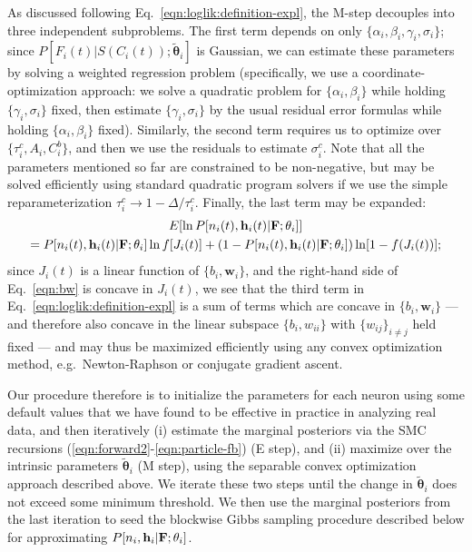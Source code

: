 \documentclass[aoas,preprint]{imsart}
\newcommand{\bth}{\mathbf{\theta}}
\newcommand{\w}{w}
\newcommand{\bw}{\mathbf{\w}}
\newcommand{\bF}{{\bf F}}
\newcommand{\bh}{\mathbf{h}}
\newcommand{\tbth}{\tilde{\bth}}
\begin{document}
As discussed following Eq.~\eqref{eqn:loglik:definition-expl}, the
M-step decouples into three independent subproblems. The first term
depends on only $\{\alpha_i, \beta_i, \gamma_i, \sigma_i\}$; since
$P[F_i(t)|S(C_i(t)); \tbth_i]$ is Gaussian, we can estimate these
parameters by solving a weighted regression problem (specifically, we
use a coordinate-optimization approach: we solve a quadratic problem
for $\{\alpha_i, \beta_i\}$ while holding $\{\gamma_i, \sigma_i\}$
fixed, then estimate $\{\gamma_i,\sigma_i\}$ by the usual residual
error formulas while holding $\{\alpha_i, \beta_i\}$
fixed). Similarly, the second term requires us to optimize over
$\{\tau_i^c, A_i, C_i^b\}$, and then we use the residuals to estimate
$\sigma_i^c$. Note that all the parameters mentioned so far are
constrained to be non-negative, but may be solved efficiently using
standard quadratic program solvers if we use the simple
reparameterization $\tau_i^c \to 1- \Delta / \tau_i^c$. Finally, the
last term may be expanded:
\begin{multline}
E [\ln P[n_i(t), \bh_i(t) | \bF; \bth_i]] \\ = P[n_i(t), \bh_i(t) |
\bF; \bth_i] \ln f [J_i(t)] + (1-P[n_i(t), \bh_i(t) | \bF; \bth_i])
\ln [1- f(J_i(t))];
\label{eqn:bw}
\end{multline}
since $J_i(t)$ is a linear function of $\{b_i,\bw_i\}$, and the
right-hand side of Eq.~\eqref{eqn:bw} is concave in $J_i(t)$, we see
that the third term in Eq.~\eqref{eqn:loglik:definition-expl} is a sum
of terms which are concave in $\{b_i,\bw_i\}$ --- and therefore also
concave in the linear subspace $\{b_i,w_{ii}\}$ with $\{w_{ij}\}_{i
\neq j}$ held fixed --- and may thus be maximized efficiently using
any convex optimization method, e.g.\ Newton-Raphson or conjugate
gradient ascent.

Our procedure therefore is to initialize the parameters for each
neuron using some default values that we have found to be effective in
practice in analyzing real data, and then iteratively (i) estimate the
marginal posteriors via the SMC recursions
(\ref{eqn:forward2}-\ref{eqn:particle-fb}) (E step), and (ii) maximize
over the intrinsic parameters $\tbth_i$ (M step), using the separable
convex optimization approach described above. We iterate these two
steps until the change in $\tbth_i$ does not exceed some minimum
threshold. We then use the marginal posteriors from the last iteration
to seed the blockwise Gibbs sampling procedure described below for
approximating $P[n_i,\bh_i | \bF;\bth_i]$.
\end{document}
